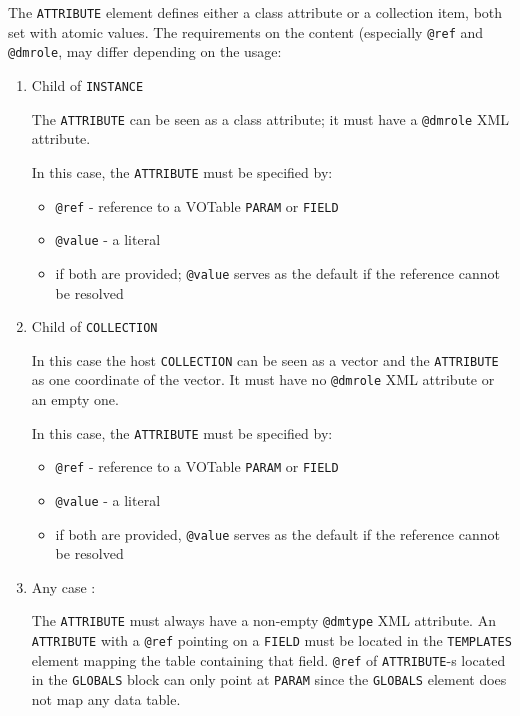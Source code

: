
The \texttt{ATTRIBUTE} element defines either a class attribute or a collection item, both set with atomic values.
The requirements on
the content (especially \texttt{@ref} and  \texttt{@dmrole}, may differ depending on
the usage:


\begin{enumerate}
\item Child of \texttt{INSTANCE}

 The \texttt{ATTRIBUTE} can be seen as a class attribute;
    it must have a \texttt{@dmrole} XML attribute.

In this case, the \texttt{ATTRIBUTE} must be specified by:
  \begin{itemize} 
      \item \texttt{@ref} - reference to a VOTable \texttt{PARAM} or \texttt{FIELD}
      \item \texttt{@value} - a literal
      \item  if both are provided; \texttt{@value} serves as the default 
      if the reference cannot be resolved
  \end{itemize}  

  
\item Child of \texttt{COLLECTION}

In this case the host \texttt{COLLECTION} can be seen as a vector and the \texttt{ATTRIBUTE} as one coordinate of the vector. 
It must have  no \texttt{@dmrole} XML attribute or an empty one.

In this case, the \texttt{ATTRIBUTE} must be specified by:
  \begin{itemize} 
      \item \texttt{@ref} - reference to a VOTable \texttt{PARAM} or \texttt{FIELD}
      \item \texttt{@value} - a literal
      \item if both are provided, \texttt{@value} serves as the default if 
      the reference cannot be resolved
  \end{itemize}  
              
\item Any case :

    The \texttt{ATTRIBUTE} must always have a non-empty \texttt{@dmtype} XML attribute.
    An \texttt{ATTRIBUTE} with a \texttt{@ref} pointing on a \texttt{FIELD} must be located in the \texttt{TEMPLATES} element
    mapping the table containing that field. \texttt{@ref} of \texttt{ATTRIBUTE}-s located in the \texttt{GLOBALS} block can only 
    point at \texttt{PARAM} since the \texttt{GLOBALS} element does not map any data table.
    
\end{enumerate}  
 
